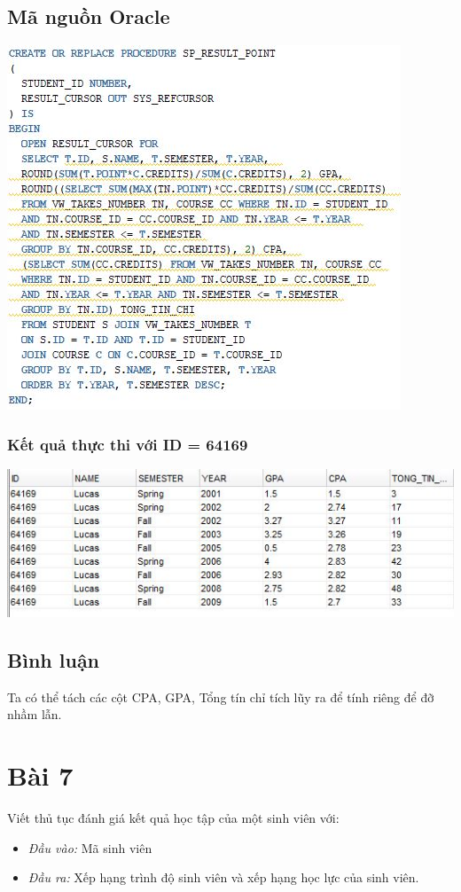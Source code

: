 \documentclass[12pt,a4paper]{report}
\begin{document}
\subsection{Mã nguồn Oracle}
\includegraphics[scale=1]{b6o}
\subsubsection{Kết quả thực thi với ID = 64169}
\includegraphics[scale=1]{kb6o}

\subsection{Bình luận}
Ta có thể tách các cột CPA, GPA, Tổng tín chỉ tích lũy ra để tính riêng để đỡ nhầm lẫn. 

\section{Bài 7}
\begin{boxedminipage}[t]{15.5cm}
Viết thủ tục đánh giá kết quả học tập của một sinh viên với:
\begin{itemize}
	\item \textit{Đầu vào:} Mã sinh viên
	\item \textit{Đầu ra:} Xếp hạng trình độ sinh viên và xếp hạng học lực của sinh viên.
\end{itemize}	
\end{boxedminipage}
\end{document}
